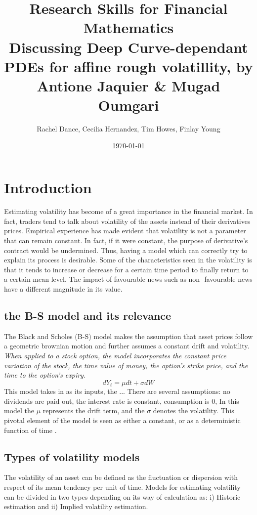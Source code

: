 \documentclass[12pt]{article}
\title{Research Skills for Financial Mathematics\\
\large{Discussing Deep Curve-dependant PDEs for affine rough volatillity, by Antione Jaquier & Mugad Oumgari}}
\author{Rachel Dance, Cecilia Hernandez, Tim Howes, Finlay Young}
\date{\today}
\begin{document}
\maketitle

\section{Introduction}

Estimating volatility has become of a great importance in the financial market. In fact, traders tend to talk about volatility of the assets instead of their derivatives prices. Empirical experience has made evident that volatility is not a parameter that can remain constant. In fact, if it were constant, the purpose of derivative's contract would be undermined. Thus, having a model which can correctly try to explain its process is desirable. Some of the characteristics seen in the volatility is that it tends to increase or decrease for a certain time period to finally return to a certain mean level. The impact of favourable news such as non- favourable news have a different magnitude in its value.

\subsection{the B-S model and its relevance}
The Black and Scholes (B-S) model makes the assumption that asset prices follow a geometric brownian motion and further assumes a constant drift and volatility. 
\emph{When applied to a stock option, the model incorporates the constant price variation of the stock, the time value of money, the option's strike price, and the time to the option's expiry.}
\begin{equation}
dY_t=\mu dt + \sigma dW
\end{equation}
This model takes in as its inputs, the ...
There are several assumptions: no dividends are paid out, the interest rate is constant, consumption is 0, 
In this model the $\mu$ represents the drift term, and the $\sigma$ denotes the volatility. This pivotal element of the model is seen as either a constant, or as a deterministic function of time \cite{BlackScholesOR, Gatheral2014}.



\subsection{Types of volatility models}

The volatility of an asset can be defined as the fluctuation or dispersion with respect of its mean tendency per unit of time. Models for estimating volatility can be divided in two types depending on its way of calculation as: i) Historic estimation and ii) Implied volatility estimation.
\end{document}
